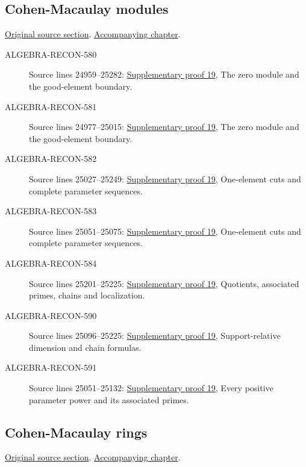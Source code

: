 \subsection{Cohen-Macaulay modules}
\hypertarget{algebra-source-section-CM}{}
\noindent\href{https://github.com/stacks/stacks-project/blob/a04446e57ec1fbc252a871afcec7752fb2807b14/algebra.tex\#L24952}{Original source section}. \href{algebra.pdf\#nameddest=section-CM}{Accompanying chapter}.

\begin{description}
\item[ALGEBRA-RECON-580] Source lines 24959--25282: \hyperlink{algebra_cm_modules_notes_20260928}{Supplementary proof 19}, The zero module and the good-element boundary.
\item[ALGEBRA-RECON-581] Source lines 24977--25015: \hyperlink{algebra_cm_modules_notes_20260928}{Supplementary proof 19}, The zero module and the good-element boundary.
\item[ALGEBRA-RECON-582] Source lines 25027--25249: \hyperlink{algebra_cm_modules_notes_20260928}{Supplementary proof 19}, One-element cuts and complete parameter sequences.
\item[ALGEBRA-RECON-583] Source lines 25051--25075: \hyperlink{algebra_cm_modules_notes_20260928}{Supplementary proof 19}, One-element cuts and complete parameter sequences.
\item[ALGEBRA-RECON-584] Source lines 25201--25225: \hyperlink{algebra_cm_modules_notes_20260928}{Supplementary proof 19}, Quotients, associated primes, chains and localization.
\item[ALGEBRA-RECON-590] Source lines 25096--25225: \hyperlink{algebra_cm_modules_notes_20260928}{Supplementary proof 19}, Support-relative dimension and chain formulas.
\item[ALGEBRA-RECON-591] Source lines 25051--25132: \hyperlink{algebra_cm_modules_notes_20260928}{Supplementary proof 19}, Every positive parameter power and its associated primes.
\end{description}

\subsection{Cohen-Macaulay rings}
\hypertarget{algebra-source-section-CM-ring}{}
\noindent\href{https://github.com/stacks/stacks-project/blob/a04446e57ec1fbc252a871afcec7752fb2807b14/algebra.tex\#L25298}{Original source section}. \href{algebra.pdf\#nameddest=section-CM-ring}{Accompanying chapter}.

